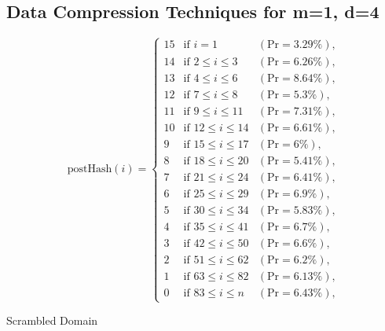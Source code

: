 \subsection{Data Compression Techniques for m=1, d=4}

{
\renewcommand{\arraystretch}{1.25}
\[
\text{postHash}(i) = \left\{
\begin{array}{lll}
    \text{15} & \text{if } i = 1 & (\text{Pr} = 3.29\%), \\
    \text{14} & \text{if } 2 \leq i \leq 3 & (\text{Pr} = 6.26\%), \\
    \text{13} & \text{if } 4 \leq i \leq 6 & (\text{Pr} = 8.64\%), \\
    \text{12} & \text{if } 7 \leq i \leq 8 & (\text{Pr} = 5.3\%), \\
    \text{11} & \text{if } 9 \leq i \leq 11 & (\text{Pr} = 7.31\%), \\
    \text{10} & \text{if } 12 \leq i \leq 14 & (\text{Pr} = 6.61\%), \\
    \text{9} & \text{if } 15 \leq i \leq 17 & (\text{Pr} = 6\%), \\
    \text{8} & \text{if } 18 \leq i \leq 20 & (\text{Pr} = 5.41\%), \\
    \text{7} & \text{if } 21 \leq i \leq 24 & (\text{Pr} = 6.41\%), \\
    \text{6} & \text{if } 25 \leq i \leq 29 & (\text{Pr} = 6.9\%), \\
    \text{5} & \text{if } 30 \leq i \leq 34 & (\text{Pr} = 5.83\%), \\
    \text{4} & \text{if } 35 \leq i \leq 41 & (\text{Pr} = 6.7\%), \\
    \text{3} & \text{if } 42 \leq i \leq 50 & (\text{Pr} = 6.6\%), \\
    \text{2} & \text{if } 51 \leq i \leq 62 & (\text{Pr} = 6.2\%), \\
    \text{1} & \text{if } 63 \leq i \leq 82 & (\text{Pr} = 6.13\%), \\
    \text{0} & \text{if } 83 \leq i \leq n & (\text{Pr} = 6.43\%),
\end{array}
\right.
\]
}


Scrambled Domain

